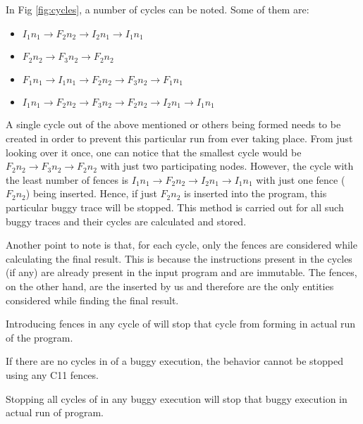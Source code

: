 \par
In Fig \ref{fig:cycles}, a number of cycles can be noted. Some of them are:
\begin{itemize}
\item \textit{$I_1n_1 \rightarrow F_2n_2 \rightarrow I_2n_1 \rightarrow I_1n_1$}
\item \textit{$F_2n_2 \rightarrow F_3n_2 \rightarrow F_2n_2$}
\item \textit{$F_1n_1 \rightarrow I_1n_1 \rightarrow F_2n_2 \rightarrow F_3n_2 \rightarrow F_1n_1$}
\item \textit{$I_1n_1 \rightarrow F_2n_2 \rightarrow F_3n_2 \rightarrow F_2n_2 \rightarrow I_2n_1 \rightarrow I_1n_1$}
\end{itemize} 
A single cycle out of the above mentioned or others being formed needs 
to be created in order to prevent this particular run from ever taking 
place. From just looking over it once, one can notice that the smallest 
cycle would be \textit{$F_2n_2 \rightarrow F_3n_2 \rightarrow F_2n_2$} 
with just two participating nodes. However, the cycle with the least 
number of fences is \textit{$I_1n_1 \rightarrow F_2n_2 \rightarrow I_2n_1 
\rightarrow I_1n_1$} with just one fence (\textit{$F_2n_2$}) being inserted. 
Hence, if just \textit{$F_2n_2$} is inserted into the program, this particular 
buggy trace will be stopped. This method is carried out for all such 
buggy traces and their cycles are calculated and stored.

Another point to note is that, for each cycle, only the fences are considered
while calculating the final result. This is because the instructions present in the
cycles (if any) are already present in the input program and are immutable.
The fences, on the other hand, are the inserted by us and therefore are the only
entities considered while finding the final result.


\begin{lemma}
	Introducing fences in any cycle of \setTO will stop that cycle 
	from forming in actual run of the program.
\end{lemma}

\begin{lemma}
	If there are no cycles in \setTO of a buggy execution, the behavior 
	cannot be stopped using any C11 fences.
\end{lemma}

\begin{theorem}
	Stopping all cycles of \setTO in any buggy execution will stop that
	buggy execution in actual run of program.
\end{theorem}

